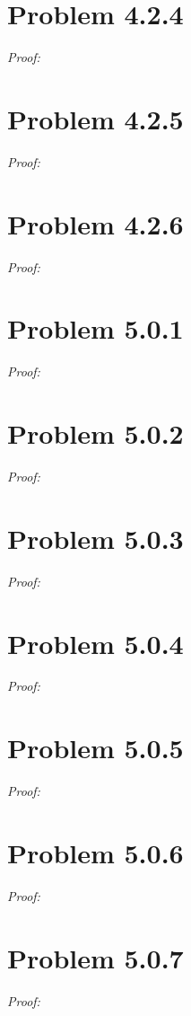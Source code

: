 \documentclass[11pt]{article}
\begin{document}
\section{Problem 4.2.4}
\textit{Proof:} 
\newpage

\section{Problem 4.2.5}
\textit{Proof:} 
\newpage

\section{Problem 4.2.6}
\textit{Proof:} 
\newpage

\section{Problem 5.0.1}
\textit{Proof:} 
\newpage

\section{Problem 5.0.2}
\textit{Proof:} 
\newpage

\section{Problem 5.0.3}
\textit{Proof:} 
\newpage

\section{Problem 5.0.4}
\textit{Proof:} 
\newpage

\section{Problem 5.0.5}
\textit{Proof:} 
\newpage

\section{Problem 5.0.6}
\textit{Proof:} 
\newpage

\section{Problem 5.0.7}
\textit{Proof:} 
\newpage
\end{document}
